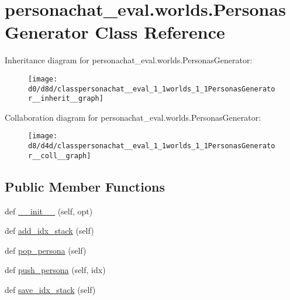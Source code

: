 \hypertarget{classpersonachat__eval_1_1worlds_1_1PersonasGenerator}{}\section{personachat\+\_\+eval.\+worlds.\+Personas\+Generator Class Reference}
\label{classpersonachat__eval_1_1worlds_1_1PersonasGenerator}


Inheritance diagram for personachat\+\_\+eval.\+worlds.\+Personas\+Generator\+:\nopagebreak
\begin{figure}[H]
\begin{center}
\leavevmode
\texttt{[image: d0/d8d/classpersonachat\_\_eval\_1\_1worlds\_1\_1PersonasGenerator\_\_inherit\_\_graph]}
\end{center}
\end{figure}


Collaboration diagram for personachat\+\_\+eval.\+worlds.\+Personas\+Generator\+:\nopagebreak
\begin{figure}[H]
\begin{center}
\leavevmode
\texttt{[image: d8/d4d/classpersonachat\_\_eval\_1\_1worlds\_1\_1PersonasGenerator\_\_coll\_\_graph]}
\end{center}
\end{figure}
\subsection*{Public Member Functions}
\begin{DoxyCompactItemize}
\item 
def \hyperlink{classpersonachat__eval_1_1worlds_1_1PersonasGenerator_a1040c1f204e103d16f0a8137c1dec671}{\+\_\+\+\_\+init\+\_\+\+\_\+} (self, opt)
\item 
def \hyperlink{classpersonachat__eval_1_1worlds_1_1PersonasGenerator_a3ee1d0c2545efba647539933d1d649d0}{add\+\_\+idx\+\_\+stack} (self)
\item 
def \hyperlink{classpersonachat__eval_1_1worlds_1_1PersonasGenerator_ac73e52e318d64155bf0812768f0e3fa3}{pop\+\_\+persona} (self)
\item 
def \hyperlink{classpersonachat__eval_1_1worlds_1_1PersonasGenerator_add94526a589a3e01f2843f88e31b754e}{push\+\_\+persona} (self, idx)
\item 
def \hyperlink{classpersonachat__eval_1_1worlds_1_1PersonasGenerator_ae6b7fbf4c1ec66c73f69de4df0357447}{save\+\_\+idx\+\_\+stack} (self)
\end{DoxyCompactItemize}
